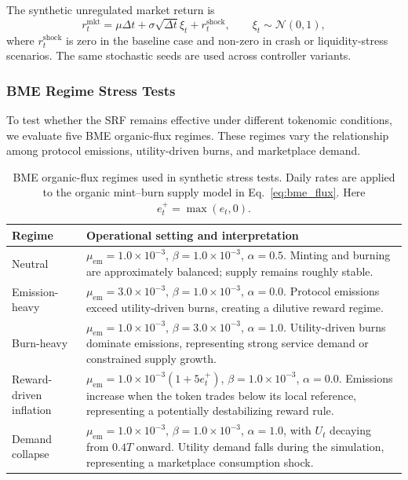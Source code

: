 \documentclass[a4paper,fleqn]{cas-dc}
\begin{document}
The synthetic unregulated market return is
\[
r_t^{\mathrm{mkt}}
=
\mu\Delta t
+
\sigma\sqrt{\Delta t}\xi_t
+
r_t^{\mathrm{shock}},
\qquad
\xi_t\sim\mathcal{N}(0,1),
\]
where \(r_t^{\mathrm{shock}}\) is zero in the baseline case and non-zero in crash or liquidity-stress scenarios. The same stochastic seeds are used across controller variants.


\subsubsection{BME Regime Stress Tests}

To test whether the SRF remains effective under different tokenomic conditions, we evaluate five BME organic-flux regimes. These regimes vary the relationship among protocol emissions, utility-driven burns, and marketplace demand.

\begin{table}[htbp]
\centering
\caption{BME organic-flux regimes used in synthetic stress tests. Daily rates are applied to the organic mint--burn supply model in Eq.~\eqref{eq:bme_flux}. Here \(e_t^{+}=\max(e_t,0)\).}
\label{tab:bme_regimes_exp}
\footnotesize
\setlength{\tabcolsep}{4pt}
\renewcommand{\arraystretch}{1.18}
\begin{tabular}{|p{}|p{}|}
\hline
\textbf{Regime} & \textbf{Operational setting and interpretation} \\
\hline

Neutral &
\(\mu_{\mathrm{em}}=1.0\times10^{-3}\), 
\(\beta=1.0\times10^{-3}\), 
\(\alpha=0.5\). 
Minting and burning are approximately balanced; supply remains roughly stable. \\
\hline

Emission-heavy &
\(\mu_{\mathrm{em}}=3.0\times10^{-3}\), 
\(\beta=1.0\times10^{-3}\), 
\(\alpha=0.0\). 
Protocol emissions exceed utility-driven burns, creating a dilutive reward regime. \\
\hline

Burn-heavy &
\(\mu_{\mathrm{em}}=1.0\times10^{-3}\), 
\(\beta=3.0\times10^{-3}\), 
\(\alpha=1.0\). 
Utility-driven burns dominate emissions, representing strong service demand or constrained supply growth. \\
\hline

Reward-driven inflation &
\(\mu_{\mathrm{em}}=1.0\times10^{-3}(1+5e_t^{+})\), 
\(\beta=1.0\times10^{-3}\), 
\(\alpha=0.0\). 
Emissions increase when the token trades below its local reference, representing a potentially destabilizing reward rule. \\
\hline

Demand collapse &
\(\mu_{\mathrm{em}}=1.0\times10^{-3}\), 
\(\beta=1.0\times10^{-3}\), 
\(\alpha=1.0\), with \(U_t\) decaying from \(0.4T\) onward. 
Utility demand falls during the simulation, representing a marketplace consumption shock. \\
\hline

\end{tabular}
\end{table}
\end{document}
